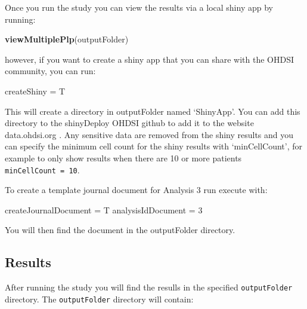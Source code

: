 \documentclass[
]{article}
\newenvironment{Shaded}{\begin{snugshade}}{\end{snugshade}}
\newcommand{\DecValTok}[1]{\textcolor[rgb]{0.00,0.00,0.81}{#1}}
\newcommand{\KeywordTok}[1]{\textcolor[rgb]{0.13,0.29,0.53}{\textbf{#1}}}
\newcommand{\NormalTok}[1]{#1}
\newcommand{\StringTok}[1]{\textcolor[rgb]{0.31,0.60,0.02}{#1}}
\begin{document}
Once you run the study you can view the results via a local shiny app by
running:

\begin{Shaded}
\begin{Highlighting}[]
    \KeywordTok{viewMultiplePlp}\NormalTok{(outputFolder) }
\end{Highlighting}
\end{Shaded}

however, if you want to create a shiny app that you can share with the
OHDSI community, you can run:

\begin{Shaded}
\begin{Highlighting}[]
\NormalTok{    createShiny =}\StringTok{ }\NormalTok{T  }
\end{Highlighting}
\end{Shaded}

This will create a directory in outputFolder named `ShinyApp'. You can
add this directory to the shinyDeploy OHDSI github to add it to the
website data.ohdsi.org . Any sensitive data are removed from the shiny
results and you can specify the minimum cell count for the shiny results
with `minCellCount', for example to only show results when there are 10
or more patients \texttt{minCellCount\ =\ 10}.

To create a template journal document for Analysis 3 run execute with:

\begin{Shaded}
\begin{Highlighting}[]
\NormalTok{    createJournalDocument =}\StringTok{ }\NormalTok{T}
\NormalTok{    analysisIdDocument =}\StringTok{ }\DecValTok{3}
\end{Highlighting}
\end{Shaded}

You will then find the document in the outputFolder directory.

\hypertarget{results}{%
\subsection{Results}\label{results}}

After running the study you will find the resulls in the specified
\texttt{outputFolder} directory. The \texttt{outputFolder} directory
will contain:
\end{document}
